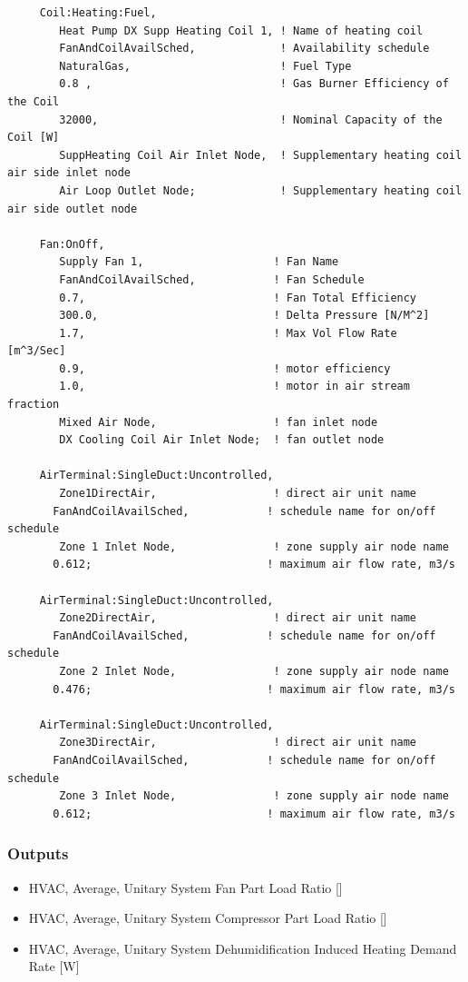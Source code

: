 \begin{lstlisting}
     Coil:Heating:Fuel,
        Heat Pump DX Supp Heating Coil 1, ! Name of heating coil
        FanAndCoilAvailSched,             ! Availability schedule
        NaturalGas,                       ! Fuel Type
        0.8 ,                             ! Gas Burner Efficiency of the Coil
        32000,                            ! Nominal Capacity of the Coil [W]
        SuppHeating Coil Air Inlet Node,  ! Supplementary heating coil air side inlet node
        Air Loop Outlet Node;             ! Supplementary heating coil air side outlet node

     Fan:OnOff,
        Supply Fan 1,                    ! Fan Name
        FanAndCoilAvailSched,            ! Fan Schedule
        0.7,                             ! Fan Total Efficiency
        300.0,                           ! Delta Pressure [N/M^2]
        1.7,                             ! Max Vol Flow Rate  [m^3/Sec]
        0.9,                             ! motor efficiency
        1.0,                             ! motor in air stream fraction
        Mixed Air Node,                  ! fan inlet node
        DX Cooling Coil Air Inlet Node;  ! fan outlet node

     AirTerminal:SingleDuct:Uncontrolled,
        Zone1DirectAir,                  ! direct air unit name
       FanAndCoilAvailSched,            ! schedule name for on/off schedule
        Zone 1 Inlet Node,               ! zone supply air node name
       0.612;                           ! maximum air flow rate, m3/s

     AirTerminal:SingleDuct:Uncontrolled,
        Zone2DirectAir,                  ! direct air unit name
       FanAndCoilAvailSched,            ! schedule name for on/off schedule
        Zone 2 Inlet Node,               ! zone supply air node name
       0.476;                           ! maximum air flow rate, m3/s

     AirTerminal:SingleDuct:Uncontrolled,
        Zone3DirectAir,                  ! direct air unit name
       FanAndCoilAvailSched,            ! schedule name for on/off schedule
        Zone 3 Inlet Node,               ! zone supply air node name
       0.612;                           ! maximum air flow rate, m3/s
\end{lstlisting}

\subsubsection{Outputs}\label{outputs-2-024}

\begin{itemize}
\item
  HVAC, Average, Unitary System Fan Part Load Ratio {[]}
\item
  HVAC, Average, Unitary System Compressor Part Load Ratio {[]}
\item
  HVAC, Average, Unitary System Dehumidification Induced Heating Demand Rate {[}W{]}
\end{itemize}

